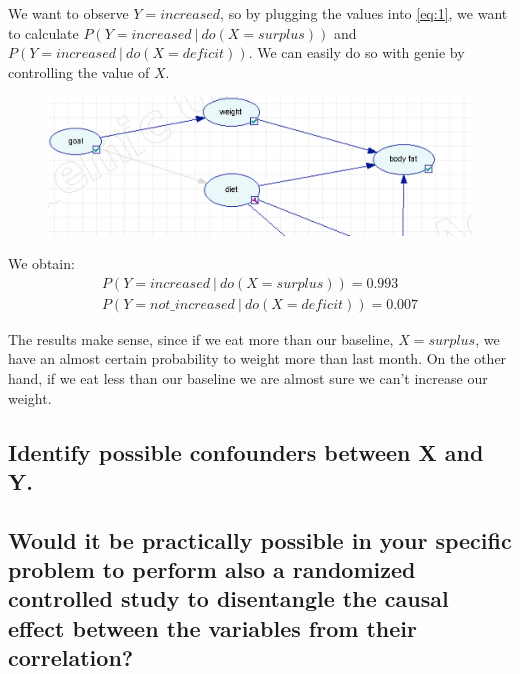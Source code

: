 \documentclass[11pt]{article}
\newcommand\given[1][]{\:#1\vert\:}
\begin{document}
We want to observe $Y=increased$, so by plugging the values into \ref{eq:1}, we want to calculate
$P(Y=increased \given do(X=surplus))$ and $P(Y=increased \given do(X=deficit))$. We can easily do so with genie by controlling the value of $X$.

\begin{figure}[H]
\includegraphics[width=\textwidth]{images/control_value/1}
\end{figure}

We obtain:
\begin{align}
P(Y=increased \given do(X=surplus)) = 0.993 \\
P(Y=not\_increased \given do(X=deficit)) = 0.007
\end{align}

The results make sense, since if we eat more than our baseline, $X=surplus$, we have an almost certain probability to weight more than last month. On the other hand, if we eat less than our baseline we are almost sure we can't increase our weight.

\subsection{Identify possible confounders between X and Y.}
\subsection{Would it be practically possible in your specific problem to perform also a randomized controlled study to disentangle the causal effect between the variables from their correlation?
}
\end{document}
